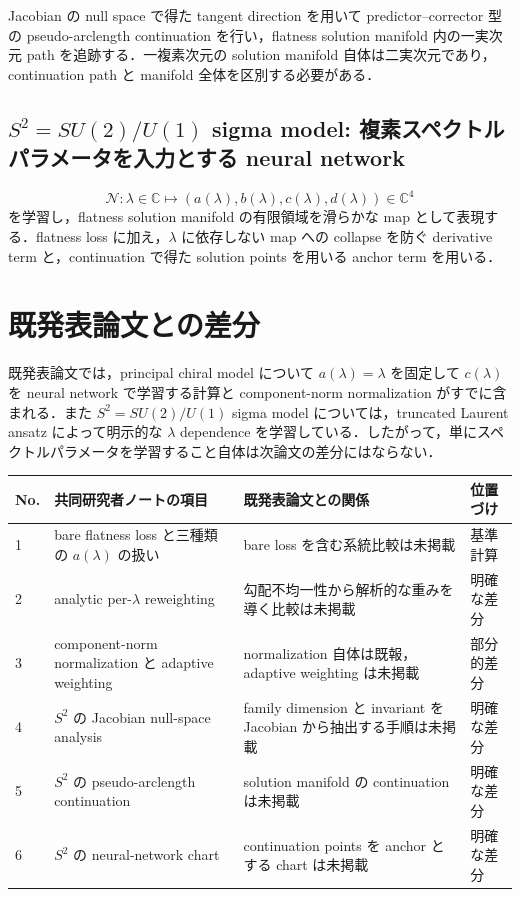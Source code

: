 \documentclass[11pt,a4paper]{ltjsarticle}
\begin{document}
Jacobian の null space で得た tangent direction を用いて predictor--corrector 型の pseudo-arclength continuation を行い，flatness solution manifold 内の一実次元 path を追跡する．一複素次元の solution manifold 自体は二実次元であり，continuation path と manifold 全体を区別する必要がある．

\subsection{$S^2=SU(2)/U(1)$ sigma model: 複素スペクトルパラメータを入力とする neural network}

\begin{equation}
\mathcal N:\lambda\in\mathbb C\longmapsto
(a(\lambda),b(\lambda),c(\lambda),d(\lambda))\in\mathbb C^4
\end{equation}
を学習し，flatness solution manifold の有限領域を滑らかな map として表現する．flatness loss に加え，$\lambda$ に依存しない map への collapse を防ぐ derivative term と，continuation で得た solution points を用いる anchor term を用いる．

\section{既発表論文との差分}

既発表論文では，principal chiral model について $a(\lambda)=\lambda$ を固定して $c(\lambda)$ を neural network で学習する計算と component-norm normalization がすでに含まれる．また $S^2=SU(2)/U(1)$ sigma model については，truncated Laurent ansatz によって明示的な $\lambda$ dependence を学習している．したがって，単にスペクトルパラメータを学習すること自体は次論文の差分にはならない．

\begin{longtable}{p{}p{}p{}p{}}
\toprule
No. & 共同研究者ノートの項目 & 既発表論文との関係 & 位置づけ \\
\midrule
1 & bare flatness loss と三種類の $a(\lambda)$ の扱い & bare loss を含む系統比較は未掲載 & 基準計算 \\
2 & analytic per-$\lambda$ reweighting & 勾配不均一性から解析的な重みを導く比較は未掲載 & 明確な差分 \\
3 & component-norm normalization と adaptive weighting & normalization 自体は既報，adaptive weighting は未掲載 & 部分的差分 \\
4 & $S^2$ の Jacobian null-space analysis & family dimension と invariant を Jacobian から抽出する手順は未掲載 & 明確な差分 \\
5 & $S^2$ の pseudo-arclength continuation & solution manifold の continuation は未掲載 & 明確な差分 \\
6 & $S^2$ の neural-network chart & continuation points を anchor とする chart は未掲載 & 明確な差分 \\
\bottomrule
\end{longtable}
\end{document}

